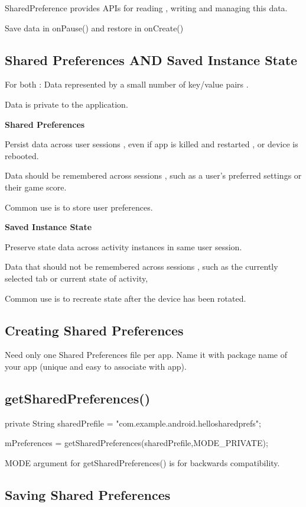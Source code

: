 \documentclass{article}
\begin{document}
SharedPreference provides APIs for reading , writing and managing this data.

Save data in onPause() and restore in onCreate()


\subsection{Shared Preferences AND Saved Instance State}

For both : Data represented by a small number of key/value pairs .

Data is private to the application.

\textbf{Shared Preferences}

Persist data across user sessions , even if app is killed and restarted , or device is rebooted.

Data should be remembered across sessions , such as a user's preferred settings or their game score.

Common use is to store user preferences.

\textbf{Saved Instance State}

Preserve state data across activity instances in same user session.

Data that should not be remembered across sessions , such as the currently selected tab or current state of activity,

Common use is to recreate state after the device has been rotated.

\subsection{Creating Shared Preferences}

Need only one Shared Preferences file per app. Name it with package name of your app (unique and easy to associate with app).

\subsection{getSharedPreferences()}

private String sharedPrefile = "com.example.android.hellosharedprefs";

mPreferences = getSharedPreferences(sharedPrefile,MODE\_PRIVATE);

MODE argument for getSharedPreferences() is for backwards compatibility.

\subsection{Saving Shared Preferences}
\end{document}
